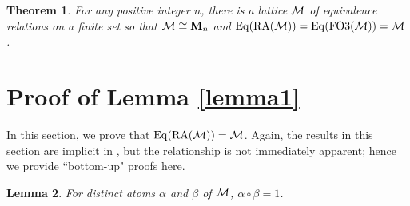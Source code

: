 \documentclass[12pt]{au}
\newtheorem{thm}{Theorem}[section]
\newtheorem{lm}[thm]{Lemma}
\begin{document}
\begin{thm}
For any positive integer $n$, there is a lattice ${{\mathcal{\uppercase {M}}}}$ of equivalence relations on a finite set so that  ${{\mathcal{\uppercase {M}}}} \cong {{\mathbf{\uppercase{M}}}}_n$ and ${{\rm Eq}}({{\rm RA}}({{\mathcal{\uppercase {M}}}}))= {{\rm Eq}}({{\rm FO3}}({{\mathcal{\uppercase {M}}}})) = {{\mathcal{\uppercase {M}}}}$.
\end{thm}

\section{Proof of Lemma \ref{lemma1}} \label{mainsection}

In this section, we prove that  ${{\rm Eq}}({{\rm RA}}({{\mathcal{\uppercase {m}}}})) = {{\mathcal{\uppercase {m}}}}$.  Again, the results in this section are implicit in \cite{Lyndon}, but the relationship is not immediately apparent; hence we provide ``bottom-up" proofs here.

\begin{lm}\label{lemma}
  For distinct atoms $\alpha$ and $\beta$ of ${{\mathcal{\uppercase {m}}}}$, $\alpha\circ\beta=1$.
\end{lm}
\end{document}
